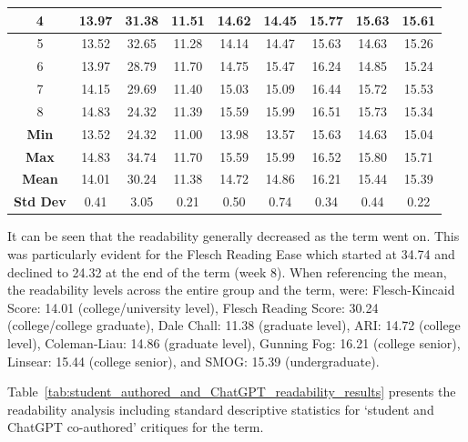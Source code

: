 \begin{table}[h!]
{\begin{tabular}{|c|c|c|c|c|c|c|c|c|}
			4                & 13.97 & 31.38 & 11.51 & 14.62 & 14.45 & 15.77 & 15.63 & 15.61 \\ \hline
			5                & 13.52 & 32.65 & 11.28 & 14.14 & 14.47 & 15.63 & 14.63 & 15.26 \\ \hline
			6                & 13.97 & 28.79 & 11.70 & 14.75 & 15.47 & 16.24 & 14.85 & 15.24 \\ \hline
			7                & 14.15 & 29.69 & 11.40 & 15.03 & 15.09 & 16.44 & 15.72 & 15.53 \\ \hline
			8                & 14.83 & 24.32 & 11.39 & 15.59 & 15.99 & 16.51 & 15.73 & 15.34 \\ \hline
			\rowcolor[HTML]{EFEFEF} 
			\textbf{Min}     & 13.52 & 24.32 & 11.00 & 13.98 & 13.57 & 15.63 & 14.63 & 15.04 \\ \hline
			\rowcolor[HTML]{EFEFEF} 
			\textbf{Max}     & 14.83 & 34.74 & 11.70 & 15.59 & 15.99 & 16.52 & 15.80 & 15.71 \\ \hline
			\rowcolor[HTML]{EFEFEF} 
			\textbf{Mean}    & 14.01 & 30.24 & 11.38 & 14.72 & 14.86 & 16.21 & 15.44 & 15.39 \\ \hline
			\rowcolor[HTML]{EFEFEF} 
			\textbf{Std Dev} & 0.41  & 3.05  & 0.21  & 0.50  & 0.74  & 0.34  & 0.44  & 0.22  \\ \hline
		\end{tabular}%
	}
\end{table}

It can be seen that the readability generally decreased as the term went on.  This was particularly evident for the Flesch Reading Ease which started at 34.74 and declined to 24.32 at the end of the term (week 8).  When referencing the mean, the readability levels across the entire group and the term, were: Flesch-Kincaid Score: 14.01 (college/university level), Flesch Reading Score: 30.24 (college/college graduate), Dale Chall: 11.38 (graduate level), ARI: 14.72 (college level), Coleman-Liau: 14.86 (graduate level), Gunning Fog: 16.21 (college senior), Linsear: 15.44 (college senior), and SMOG: 15.39 (undergraduate).

Table~\ref{tab:student_authored_and_ChatGPT_readability_results} presents the readability analysis including standard descriptive statistics for `student and ChatGPT co-authored' critiques for the term. 

